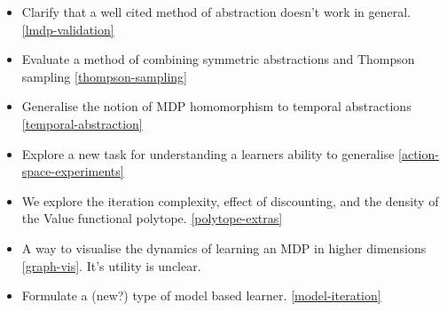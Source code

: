 \begin{itemize}
  \tightlist
  \item Clarify that a well cited method of abstraction doesn't work in general. \ref{lmdp-validation}
  \item Evaluate a method of combining symmetric abstractions and Thompson sampling \ref{thompson-sampling}
  \item Generalise the notion of MDP homomorphism to temporal abstractions \ref{temporal-abstraction}
  \item Explore a new task for understanding a learners ability to generalise \ref{action-space-experiments}
  \item We explore the iteration complexity, effect of discounting, and the density of the Value functional polytope. \ref{polytope-extras}
  \item A way to visualise the dynamics of learning an MDP in higher dimensions \ref{graph-vis}. It's utility is unclear.
  \item Formulate a (new?) type of model based learner. \ref{model-iteration}
\end{itemize}
